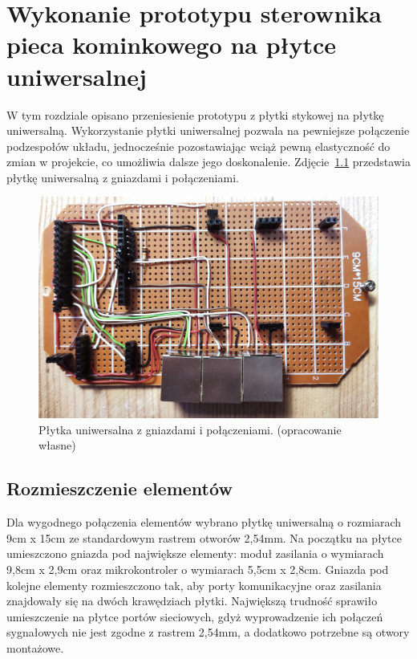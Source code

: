 \documentclass[11pt]{report}
\begin{document}
 \chapter[Wykonanie prototypu sterownika pieca kominkowego\\ na płytce uniwersalnej]{Wykonanie prototypu sterownika pieca kominkowego na płytce uniwersalnej}\label{ch:prototyp:uniwersalna}
 W tym rozdziale opisano przeniesienie prototypu z płytki stykowej na płytkę uniwersalną.
 Wykorzystanie płytki uniwersalnej pozwala na pewniejsze połączenie podzespołów układu, jednocześnie pozostawiając wciąż pewną elastyczność do zmian w projekcie, co umożliwia dalsze jego doskonalenie.
 Zdjęcie~\ref{fig:uni_gora} przedstawia płytkę uniwersalną z gniazdami i połączeniami.
\begin{figure}[ht]
\centering
\includegraphics[width=0.8 \textwidth]{fig/plytka_gora.jpg}
\caption{Płytka uniwersalna z gniazdami i połączeniami. (opracowanie własne)}
\label{fig:uni_gora}
\end{figure}
 
 \section{Rozmieszczenie elementów}
 Dla wygodnego połączenia elementów wybrano płytkę uniwersalną o rozmiarach 9cm x 15cm ze standardowym rastrem otworów 2,54mm.
 Na początku na płytce umieszczono gniazda pod największe elementy: moduł zasilania o wymiarach 9,8cm x 2,9cm oraz mikrokontroler o wymiarach 5,5cm x 2,8cm. Gniazda pod kolejne elementy rozmieszczono tak, aby porty komunikacyjne oraz zasilania znajdowały się na dwóch krawędziach płytki. 
 Największą trudność sprawiło umieszczenie na płytce portów sieciowych, gdyż wyprowadzenie ich połączeń sygnałowych nie jest zgodne z rastrem 2,54mm, a dodatkowo potrzebne są otwory montażowe.
  
\end{document}
